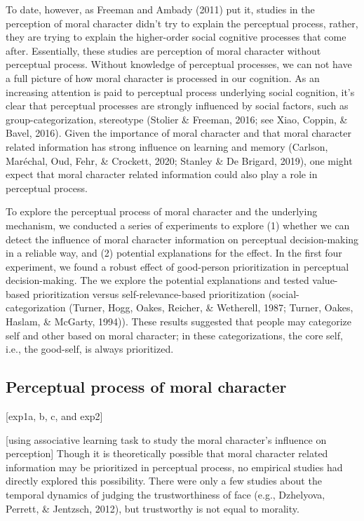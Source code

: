 \documentclass[
  english,
  man]{apa6}
\begin{document}
To date, however, as Freeman and Ambady (2011) put it, studies in the perception of moral character didn't try to explain the perceptual process, rather, they are trying to explain the higher-order social cognitive processes that come after. Essentially, these studies are perception of moral character without perceptual process. Without knowledge of perceptual processes, we can not have a full picture of how moral character is processed in our cognition. As an increasing attention is paid to perceptual process underlying social cognition, it's clear that perceptual processes are strongly influenced by social factors, such as group-categorization, stereotype (Stolier \& Freeman, 2016; see Xiao, Coppin, \& Bavel, 2016). Given the importance of moral character and that moral character related information has strong influence on learning and memory (Carlson, Maréchal, Oud, Fehr, \& Crockett, 2020; Stanley \& De Brigard, 2019), one might expect that moral character related information could also play a role in perceptual process.

To explore the perceptual process of moral character and the underlying mechanism, we conducted a series of experiments to explore (1) whether we can detect the influence of moral character information on perceptual decision-making in a reliable way, and (2) potential explanations for the effect. In the first four experiment, we found a robust effect of good-person prioritization in perceptual decision-making. The we explore the potential explanations and tested value-based prioritization versus self-relevance-based prioritization (social-categorization (Turner, Hogg, Oakes, Reicher, \& Wetherell, 1987; Turner, Oakes, Haslam, \& McGarty, 1994)). These results suggested that people may categorize self and other based on moral character; in these categorizations, the core self, i.e., the good-self, is always prioritized.

\hypertarget{perceptual-process-of-moral-character}{%
\subsection{Perceptual process of moral character}\label{perceptual-process-of-moral-character}}

{[}exp1a, b, c, and exp2{]}

{[}using associative learning task to study the moral character's influence on perception{]} Though it is theoretically possible that moral character related information may be prioritized in perceptual process, no empirical studies had directly explored this possibility. There were only a few studies about the temporal dynamics of judging the trustworthiness of face (e.g., Dzhelyova, Perrett, \& Jentzsch, 2012), but trustworthy is not equal to morality.
\end{document}
